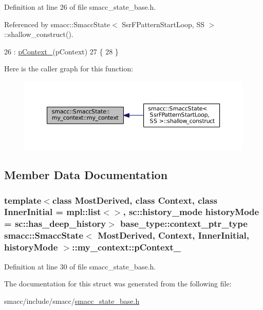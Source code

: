 Definition at line 26 of file smacc\+\_\+state\+\_\+base.\+h.



Referenced by smacc\+::\+Smacc\+State$<$ Ssr\+F\+Pattern\+Start\+Loop, S\+S $>$\+::shallow\+\_\+construct().


\begin{DoxyCode}
26                                                             : \hyperlink{structsmacc_1_1SmaccState_1_1my__context_a85f6eff5aba687932efe3f8117be76d3}{pContext\_}(pContext)
27     \{
28     \}
\end{DoxyCode}


Here is the caller graph for this function\+:
\nopagebreak
\begin{figure}[H]
\begin{center}
\leavevmode
\includegraphics[width=350pt]{structsmacc_1_1SmaccState_1_1my__context_af9c11c27b17bbf7de0d4e21c87d49f6f_icgraph}
\end{center}
\end{figure}




\subsection{Member Data Documentation}
\subsubsection[{\texorpdfstring{p\+Context\+\_\+}{pContext_}}]{\setlength{\rightskip}{0pt plus 5cm}template$<$class Most\+Derived, class Context, class Inner\+Initial = mpl\+::list$<$$>$, sc\+::history\+\_\+mode history\+Mode = sc\+::has\+\_\+deep\+\_\+history$>$ base\+\_\+type\+::context\+\_\+ptr\+\_\+type {\bf smacc\+::\+Smacc\+State}$<$ Most\+Derived, Context, Inner\+Initial, history\+Mode $>$\+::my\+\_\+context\+::p\+Context\+\_\+}\hypertarget{structsmacc_1_1SmaccState_1_1my__context_a85f6eff5aba687932efe3f8117be76d3}{}\label{structsmacc_1_1SmaccState_1_1my__context_a85f6eff5aba687932efe3f8117be76d3}


Definition at line 30 of file smacc\+\_\+state\+\_\+base.\+h.



The documentation for this struct was generated from the following file\+:\begin{DoxyCompactItemize}
\item 
smacc/include/smacc/\hyperlink{smacc__state__base_8h}{smacc\+\_\+state\+\_\+base.\+h}\end{DoxyCompactItemize}
